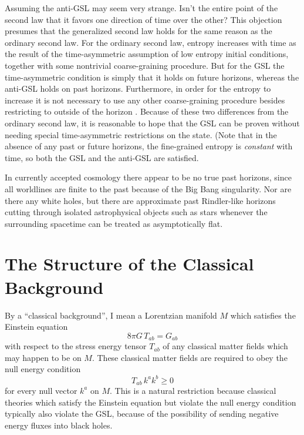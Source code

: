 \documentclass{article}
\begin{document}
Assuming the anti-GSL may seem very strange.  Isn't the entire point of the second law that it favors one direction of time over the other?  This objection presumes that the generalized second law holds for the same reason as the ordinary second law.  For the ordinary second law, entropy increases with time as the result of the time-asymmetric assumption of low entropy initial conditions, together with some nontrivial coarse-graining procedure.  But for the GSL the time-asymmetric condition is simply that it holds on future horizons, whereas the anti-GSL holds on past horizons.  Furthermore, in order for the entropy to increase it is not necessary to use any other coarse-graining procedure besides restricting to outside of the horizon \cite{10proofs}.  Because of these two differences from the ordinary second law, it is reasonable to hope that the GSL can be proven without needing special time-asymmetric restrictions on the state.  (Note that in the absence of any past or future horizons, the fine-grained entropy is \emph{constant} with time, so both the GSL and the anti-GSL are satisfied.

In currently accepted cosmology there appear to be no true past horizons, since all worldlines are finite to the past because of the Big Bang singularity.  Nor are there any white holes, but there are approximate past Rindler-like horizons cutting through isolated astrophysical objects such as stars whenever the surrounding spacetime can be treated as asymptotically flat.

\section{The Structure of the Classical Background}\label{class}

By a ``classical background'', I mean a Lorentzian manifold $M$ which satisfies the Einstein equation
\begin{equation}\label{Ein}
 8\pi G\,T_{ab} = G_{ab}
\end{equation}
with respect to the stress energy tensor $T_{ab}$ of any classical matter fields which may happen to be on $M$.  These classical matter fields are required to obey the null energy condition
\begin{equation}
T_{ab}\,k^a k^b \ge 0
\end{equation}
for every null vector $k^a$ on $M$.  This is a natural restriction because classical theories which satisfy the Einstein equation but violate the null energy condition typically also violate the GSL, because of the possibility of sending negative energy fluxes into black holes.
\end{document}
